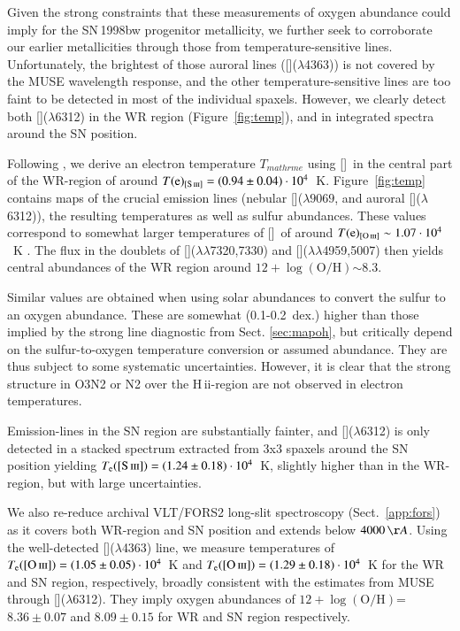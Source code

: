 \documentclass[traditabstract]{aa}
\newcommand{\hii}{\mbox{H\,{\sc ii}}}
\newcommand{\oh}{$12+\log(\mathrm{O/H})$}
\newcommand{\siii}{[\ion{S}{iii}]}
\newcommand{\oii}{[\ion{O}{ii}]}
\newcommand{\oiii}{[\ion{O}{iii}]}
\begin{document}
Given the strong constraints that these measurements of oxygen abundance could imply for the SN\,1998bw progenitor metallicity, we further seek to corroborate our earlier metallicities through those from temperature-sensitive lines. Unfortunately, the brightest of those auroral lines (\oiii($\lambda$4363)) is not covered by the MUSE wavelength response, and the other temperature-sensitive lines are too faint to be detected in most of the individual spaxels. However, we clearly detect both \siii($\lambda$6312) in the WR region (Figure~\ref{fig:temp}), and in integrated spectra around the SN position.



Following \citet{2013ApJS..207...21N}, we derive an electron temperature $T_{mathrm{e}}$ using \siii\, in the central part of the WR-region of around $T(\mathrm{e})_{\siii}=(0.94\pm0.04)\cdot10^{4}$~K. Figure~\ref{fig:temp} contains maps of the crucial emission lines (nebular \siii($\lambda9069$, and auroral \siii($\lambda$6312)), the resulting temperatures as well as sulfur abundances. These values correspond to somewhat larger temperatures of \oiii~of around $T(\mathrm{e})_{\oiii} \sim 1.07\cdot10^{4}$~K \citep{2006A&A...448..955I, 2012A&A...547A..29B}. The flux in the doublets of \oii($\lambda\lambda$7320,7330) and \oiii($\lambda\lambda$4959,5007) then yields central abundances of the WR region around \oh $\sim 8.3$.

Similar values are obtained when using solar abundances to convert the sulfur to an oxygen abundance. These are somewhat (0.1-0.2~dex.) higher than those implied by the strong line diagnostic from Sect. \ref{sec:mapoh}, but critically depend on the sulfur-to-oxygen temperature conversion or assumed abundance. They are thus subject to some systematic uncertainties. However, it is clear that the strong structure in O3N2 or N2 over the \hii-region are not observed in electron temperatures.

Emission-lines in the SN region are substantially fainter, and \siii($\lambda$6312) is only detected in a stacked spectrum extracted from 3x3 spaxels around the SN position yielding $T_{\mathrm{e}}(\siii)=(1.24\pm0.18)\cdot10^{4}$~K, slightly higher than in the WR-region, but with large uncertainties.

We also re-reduce archival VLT/FORS2 long-slit spectroscopy (Sect.~\ref{app:fors}) as it covers both WR-region and SN position and extends below $4000\,\AA$. Using the well-detected \oiii($\lambda$4363) line, we measure temperatures of $T_{\mathrm{e}}(\oiii)=(1.05\pm0.05)\cdot 10^{4}$~K and $T_{\mathrm{e}}(\oiii)=(1.29\pm0.18)\cdot10^{4}$~K for the WR and SN region, respectively, broadly consistent with the estimates from MUSE through \siii($\lambda$6312). They imply oxygen abundances of \oh=$8.36\pm0.07$ and $8.09\pm0.15$ for WR and SN region respectively.
\end{document}
